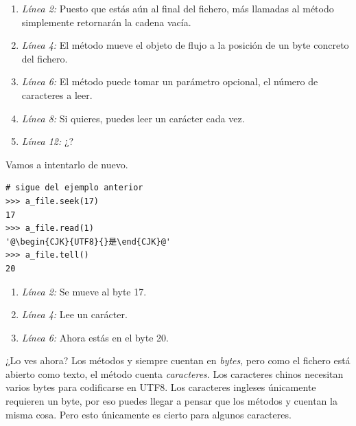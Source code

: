 \begin{enumerate}

\item \emph{Línea 2:} Puesto que estás aún al final del fichero, más llamadas al método  simplemente retornarán la cadena vacía.

\item \emph{Línea 4:} El método  mueve el objeto de flujo a la posición de un byte concreto del fichero.

\item \emph{Línea 6:} El método  puede tomar un parámetro opcional, el número de caracteres a leer.

\item \emph{Línea 8:} Si quieres, puedes leer un carácter cada vez.

\item \emph{Línea 12:} ¿?

\end{enumerate}

Vamos a intentarlo de nuevo.

\noindent\begin{minipage}{\textwidth}
\begin{lstlisting}[mathescape=True,escapeinside=@@]
# sigue del ejemplo anterior
>>> a_file.seek(17)
17
>>> a_file.read(1)
'@\begin{CJK}{UTF8}{}是\end{CJK}@'
>>> a_file.tell()
20
\end{lstlisting}
\end{minipage}

\begin{enumerate}

\item \emph{Línea 2:} Se mueve al byte 17.

\item \emph{Línea 4:} Lee un carácter.

\item \emph{Línea 6:} Ahora estás en el byte 20.

\end{enumerate}

¿Lo ves ahora? Los métodos  y  siempre cuentan en \emph{bytes}, pero como el fichero está abierto como texto, el método  cuenta \emph{caracteres}. Los caracteres chinos necesitan varios bytes para codificarse en UTF8. Los caracteres ingleses únicamente requieren un byte, por eso puedes llegar a pensar que los métodos  y  cuentan la misma cosa. Pero esto únicamente es cierto para algunos caracteres.

